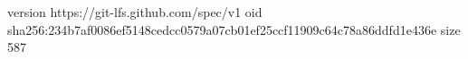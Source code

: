 version https://git-lfs.github.com/spec/v1
oid sha256:234b7af0086ef5148cedcc0579a07cb01ef25ccf11909c64c78a86ddfd1e436e
size 587
